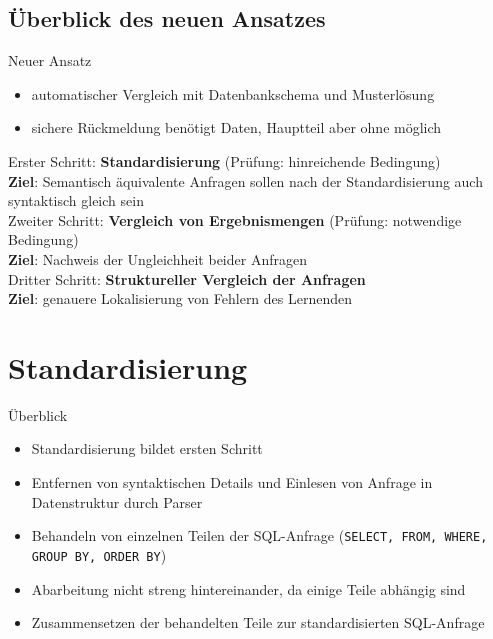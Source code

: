 \documentclass{beamer}
\begin{document}
\subsection{Überblick des neuen Ansatzes}

\begin{frame}{Neuer Ansatz}
\begin{itemize}
\item automatischer Vergleich mit Datenbankschema und Musterlösung
\item sichere Rückmeldung benötigt Daten, Hauptteil aber ohne möglich
\end{itemize}

Erster Schritt: \textbf{Standardisierung} (Prüfung: hinreichende Bedingung) \\
\textbf{Ziel}: Semantisch äquivalente Anfragen sollen nach der Standardisierung auch syntaktisch gleich sein \\
\vspace{4mm}
Zweiter Schritt: \textbf{Vergleich von Ergebnismengen} (Prüfung: notwendige Bedingung)\\
\textbf{Ziel}: Nachweis der Ungleichheit beider Anfragen \\
\vspace{4mm}
Dritter Schritt: \textbf{Struktureller Vergleich der Anfragen}\\
\textbf{Ziel}: genauere Lokalisierung von Fehlern des Lernenden
\end{frame}


\section{Standardisierung}

\begin{frame}[fragile]{Überblick}
\begin{itemize}
\item Standardisierung bildet ersten Schritt 
\item Entfernen von syntaktischen Details und Einlesen von Anfrage in Datenstruktur durch Parser
\item Behandeln von einzelnen Teilen der SQL-Anfrage (\verb|SELECT, FROM, WHERE, GROUP BY, ORDER BY|)
\item Abarbeitung nicht streng hintereinander, da einige Teile abhängig sind
\item Zusammensetzen der behandelten Teile zur standardisierten SQL-Anfrage
\end{itemize}
\end{frame}
\end{document}
